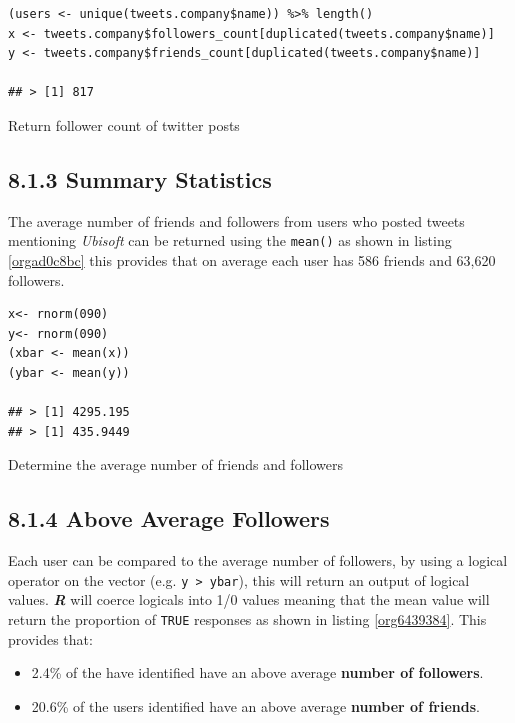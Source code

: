 \documentclass[11pt]{article}
\begin{document}
\begin{listing}[htbp]
\begin{verbatim}
(users <- unique(tweets.company$name)) %>% length()
x <- tweets.company$followers_count[duplicated(tweets.company$name)]
y <- tweets.company$friends_count[duplicated(tweets.company$name)]

## > [1] 817
\end{verbatim}
\caption{\label{org1e7818f}Return follower count of twitter posts}
\end{listing}


\subsection{8.1.3 Summary Statistics}
\label{sec:org8dfa1ee}
The average number of friends and followers from users who posted tweets mentioning \emph{Ubisoft} can be returned using the \texttt{mean()} as shown in listing \ref{orgad0c8bc}
this provides that on average each user has 586 friends and 63,620 followers.

\begin{listing}[htbp]
\begin{verbatim}
x<- rnorm(090)
y<- rnorm(090)
(xbar <- mean(x))
(ybar <- mean(y))

## > [1] 4295.195
## > [1] 435.9449
\end{verbatim}
\caption{\label{orgad0c8bc}Determine the average number of friends and followers}
\end{listing}

\subsection{8.1.4 Above Average Followers}
\label{sec:org288b86f}
Each user can be compared to the average number of followers, by using a logical
operator on the vector (e.g. \texttt{y > ybar}), this will return an output of logical
values. \textbf{\emph{R}} will coerce logicals into 1/0 values meaning that the mean value
will return the proportion of \texttt{TRUE} responses as shown in listing \ref{org6439384}. This
provides that:

\begin{itemize}
\item 2.4\%  of the have identified have an above average \textbf{number of followers}.
\item 20.6\% of the users identified have an above average \textbf{number of friends}.
\end{itemize}
\end{document}
